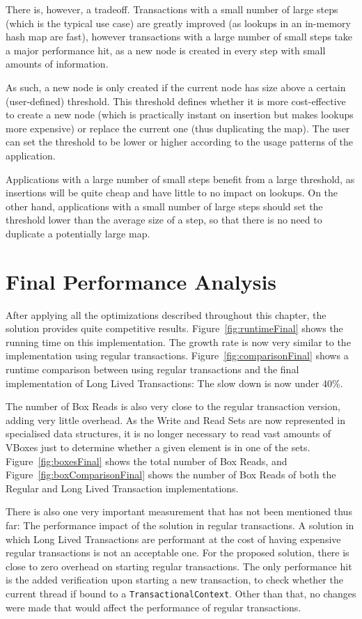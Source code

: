 There is, however, a tradeoff. Transactions with a small number of large
steps (which is the typical use case) are greatly improved (as lookups
in an in-memory hash map are fast), however transactions with a large
number of small steps take a major performance hit, as a new node is
created in every step with small amounts of information.

As such, a new node is only created if the current node has size above
a certain (user-defined) threshold. This threshold defines whether it
is more cost-effective to create a new node (which is practically
instant on insertion but makes lookups more expensive) or replace the
current one (thus duplicating the map). The user can set the threshold
to be lower or higher according to the usage patterns of the
application.

Applications with a large number of small steps benefit from a large
threshold, as insertions will be quite cheap and have little to no
impact on lookups. On the other hand, applications with a small number
of large steps should set the threshold lower than the average size of
a step, so that there is no need to duplicate a potentially large map.

\section{Final Performance Analysis}

After applying all the optimizations described throughout this
chapter, the solution provides quite competitive
results. Figure~\ref{fig:runtimeFinal} shows the running time on this
implementation. The growth rate is now very similar to the
implementation using regular
transactions. Figure~\ref{fig:comparisonFinal} shows a runtime
comparison between using regular transactions and the final
implementation of Long Lived Transactions: The slow down is now under
40\%.

The number of Box Reads is also very close to the regular transaction
version, adding very little overhead. As the Write and Read Sets are
now represented in specialised data structures, it is no longer
necessary to read vast amounts of VBoxes just to determine whether a
given element is in one of the sets. Figure~\ref{fig:boxesFinal} shows
the total number of Box Reads, and Figure~\ref{fig:boxComparisonFinal}
shows the number of Box Reads of both the Regular and Long Lived
Transaction implementations.

There is also one very important measurement that has not been
mentioned thus far: The performance impact of the solution in regular
transactions. A solution in which Long Lived Transactions are
performant at the cost of having expensive regular transactions is not
an acceptable one. For the proposed solution, there is close to zero
overhead on starting regular transactions. The only performance hit is
the added verification upon starting a new transaction, to check
whether the current thread if bound to a
\texttt{TransactionalContext}. Other than that, no changes were made
that would affect the performance of regular transactions.

